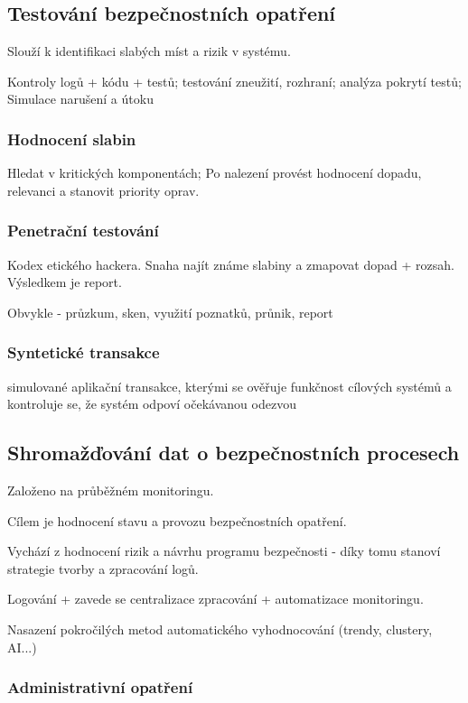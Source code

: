 \documentclass[10pt,a4paper]{article}
\begin{document}
\subsection*{Testování bezpečnostních opatření}
Slouží k identifikaci slabých míst a rizik v systému.

Kontroly logů + kódu + testů; testování zneužití, rozhraní; analýza pokrytí testů; Simulace narušení a útoku

\subsubsection*{Hodnocení slabin}
Hledat v kritických komponentách; Po nalezení provést hodnocení dopadu, relevanci a stanovit priority oprav.

\subsubsection*{Penetrační testování}

Kodex etického hackera. Snaha najít známe slabiny a zmapovat dopad + rozsah. Výsledkem je report.

Obvykle - průzkum, sken, využití poznatků, průnik, report

\subsubsection*{Syntetické transakce}
simulované aplikační transakce, kterými se ověřuje funkčnost cílových systémů a kontroluje se, že systém odpoví očekávanou odezvou

\subsection*{Shromažďování dat o bezpečnostních procesech}
Založeno na průběžném monitoringu.

Cílem je hodnocení stavu a provozu bezpečnostních opatření.

Vychází z hodnocení rizik a návrhu programu bezpečnosti - díky tomu stanoví strategie tvorby a zpracování logů.

Logování + zavede se centralizace zpracování + automatizace monitoringu.

Nasazení pokročilých metod automatického vyhodnocování (trendy, clustery, AI...)

\subsubsection*{Administrativní opatření}
\end{document}
